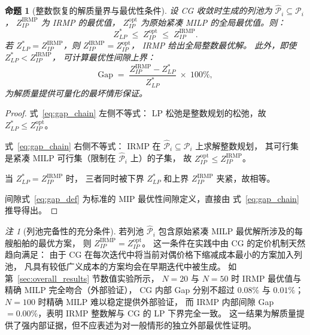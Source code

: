\documentclass[UTF8, a4paper, 12pt]{ctexart}
\theoremstyle{plain}
\newtheorem{proposition}{命题}
\theoremstyle{definition}
\theoremstyle{remark}
\newtheorem{remark}{注}
\begin{document}
\begin{proposition}[整数恢复的解质量界与最优性条件]
\label{prop:integer_recovery}
设 CG 收敛时生成的列池为 $\hat{\mathcal{P}}_i\subseteq\mathcal{P}_i$，
$Z_{IP}^{\text{IRMP}}$ 为 IRMP 的最优值，
$Z_{IP}^{\text{opt}}$ 为原始紧凑 MILP 的全局最优值。则：
\begin{equation}
  Z_{LP}^* \;\le\; Z_{IP}^{\text{opt}} \;\le\; Z_{IP}^{\text{IRMP}}.
  \label{eq:gap_chain}
\end{equation}
若 $Z_{LP}^* = Z_{IP}^{\text{IRMP}}$，则 $Z_{IP}^{\text{IRMP}} = Z_{IP}^{\text{opt}}$，
IRMP 给出全局整数最优解。
此外，即使 $Z_{LP}^* < Z_{IP}^{\text{IRMP}}$，
可计算最优性间隙上界：
\begin{equation}
  \text{Gap} \;=\; \frac{Z_{IP}^{\text{IRMP}} - Z_{LP}^*}{Z_{LP}^*} \;\times\; 100\%,
  \label{eq:gap_def}
\end{equation}
为解质量提供可量化的最坏情形保证。
\end{proposition}

\begin{proof}
式~\eqref{eq:gap_chain} 左侧不等式：
LP 松弛是整数规划的松弛，故 $Z_{LP}^*\le Z_{IP}^{\text{opt}}$。

式~\eqref{eq:gap_chain} 右侧不等式：
IRMP 在 $\hat{\mathcal{P}}_i\subseteq\mathcal{P}_i$ 上求解整数规划，
其可行集是紧凑 MILP 可行集（限制在 $\hat{\mathcal{P}}_i$ 上）的子集，
故 $Z_{IP}^{\text{opt}}\le Z_{IP}^{\text{IRMP}}$。

当 $Z_{LP}^* = Z_{IP}^{\text{IRMP}}$ 时，
三者同时被下界 $Z_{LP}^*$ 和上界 $Z_{IP}^{\text{IRMP}}$ 夹紧，故相等。

间隙式~\eqref{eq:gap_def} 为标准的 MIP 最优性间隙定义，直接由
式~\eqref{eq:gap_chain} 推导得出。
\end{proof}

\begin{remark}[列池完备性的充分条件]
\label{rem:pool_complete}
若列池 $\hat{\mathcal{P}}_i$ 包含原始紧凑 MILP 最优解所涉及的每艘船舶的最优方案，
则 $Z_{IP}^{\text{IRMP}} = Z_{IP}^{\text{opt}}$。
这一条件在实践中由 CG 的定价机制天然趋向满足：
由于 CG 在每次迭代中将当前对偶价格下缩减成本最小的方案加入列池，
凡具有较低广义成本的方案均会在早期迭代中被生成。
如第~\ref{sec:overall_results} 节数值实验所示，
$N=20$ 与 $N=50$ 时 IRMP 最优值与精确 MILP 完全吻合（外部验证），
CG 内部 Gap 分别不超过 $0.08\%$ 与 $0.01\%$；
$N=100$ 时精确 MILP 难以稳定提供外部验证，
而 IRMP 内部间隙 Gap $= 0.00\%$，表明 IRMP 整数解与 CG 的 LP 下界完全一致。
这一结果为解质量提供了强内部证据，但不应表述为对一般情形的独立外部最优性证明。
\end{remark}
\end{document}

